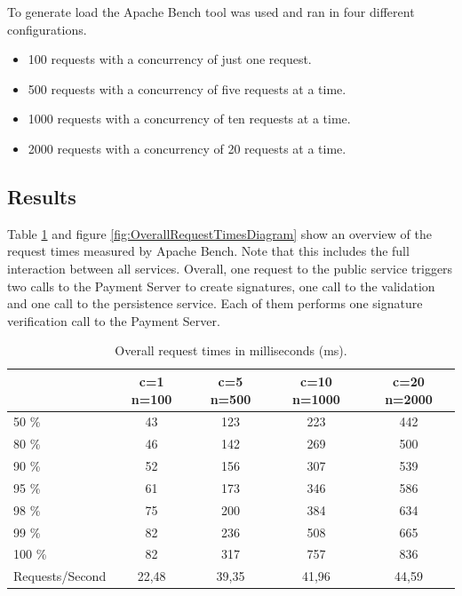 \documentclass[a4paper,12pt]{scrartcl}
\begin{document}
To generate load the Apache Bench \cite{web54} tool was used and ran in four different configurations.
\begin{itemize}
\item 100 requests with a concurrency of just one request.
\item 500 requests with a concurrency of five requests at a time.
\item 1000 requests with a concurrency of ten requests at a time.
\item 2000 requests with a concurrency of 20 requests at a time.
\end{itemize}

\subsection{Results}

Table \ref{tab:OverallRequestTimesTable} and figure \ref{fig:OverallRequestTimesDiagram} show an overview of the request times measured by Apache Bench. Note that this includes the full interaction between all services. Overall, one request to the public service triggers two calls to the Payment Server to create signatures, one call to the validation and one call to the persistence service. Each of them performs one signature verification call to the Payment Server.\\

\begin{table}[H]
    \centering
    \label{tab:OverallRequestTimesTable}
    \begin{tabular}{|l|c|c|c|c|}
        \hline
        &   c=1 n=100   & c=5 n=500 &   c=10 n=1000 & c=20 n=2000\\
        \hline
        50 \%   &   43          &   123     &   223         &   442\\
        \hline
        80 \%   &   46          &   142     &   269         &   500\\
        \hline
        90 \%   &   52          &   156     &   307         &   539\\
        \hline
        95 \%   &   61          &   173     &   346         &   586\\
        \hline
        98 \%   &   75          &   200     &   384         &   634\\
        \hline
        99 \%   &   82          &   236     &   508         &   665\\
        \hline
        100 \%   &   82          &   317     &   757         &   836\\
        \hline
        \hline
        Requests/Second   &   22,48          &   39,35     &   41,96         &   44,59\\
        \hline
    \end{tabular}
    \caption{Overall request times in milliseconds (ms).}
\end{table}
\end{document}
